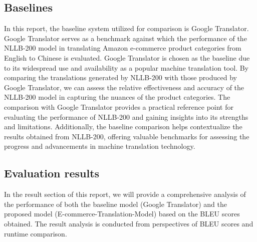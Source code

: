 \documentclass[sigconf]{acmart}
\begin{document}
\subsection{Baselines}
In this report, the baseline system utilized for comparison is Google Translator. Google Translator serves as a benchmark against which the performance of the NLLB-200 model in translating Amazon e-commerce product categories from English to Chinese is evaluated. Google Translator\cite{sutrisno_2020} is chosen as the baseline due to its widespread use and availability as a popular machine translation tool. By comparing the translations generated by NLLB-200 with those produced by Google Translator, we can assess the relative effectiveness and accuracy of the NLLB-200 model in capturing the nuances of the product categories. The comparison with Google Translator provides a practical reference point for evaluating the performance of NLLB-200 and gaining insights into its strengths and limitations. Additionally, the baseline comparison helps contextualize the results obtained from NLLB-200, offering valuable benchmarks for assessing the progress and advancements in machine translation technology.

\subsection{Evaluation results}
In the result section of this report, we will provide a comprehensive analysis of the performance of both the baseline model (Google Translator) and the proposed model (E-commerce-Translation-Model) based on the BLEU scores obtained. The result analysis is conducted from perspectives of BLEU scores and runtime comparison.
\end{document}

